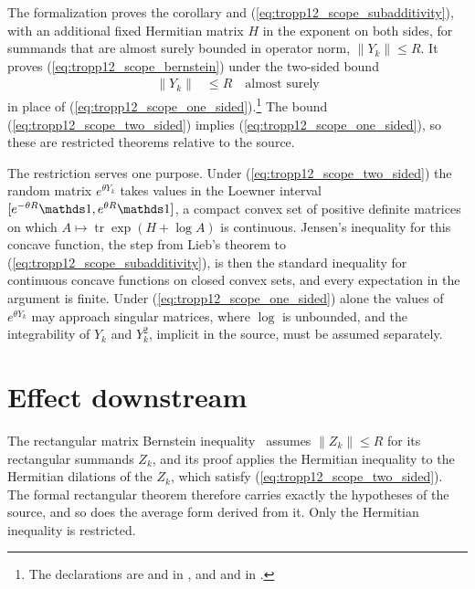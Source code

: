 \documentclass{article}
\begin{document}
The formalization proves the corollary and (\ref{eq:tropp12_scope_subadditivity}), with an
additional fixed Hermitian matrix $H$ in the exponent on both sides, for
summands that are almost surely bounded in operator norm, $\|Y_k\|\le R$. It
proves (\ref{eq:tropp12_scope_bernstein}) under the two-sided bound
\begin{align}
    \|Y_k\| & \le R\quad\text{almost surely}
    \label{eq:tropp12_scope_two_sided}
\end{align}
in place of (\ref{eq:tropp12_scope_one_sided}).\footnote{The declarations are
     and
     in
    , and
     and
     in
    .} The bound
(\ref{eq:tropp12_scope_two_sided}) implies
(\ref{eq:tropp12_scope_one_sided}), so these are restricted theorems relative
to the source.

The restriction serves one purpose. Under (\ref{eq:tropp12_scope_two_sided})
the random matrix $e^{\theta Y_k}$ takes values in the Loewner interval
$[e^{-\theta R}\Id,e^{\theta R}\Id]$, a compact convex set of positive definite
matrices on which $A\mapsto\operatorname{tr}\exp(H+\log A)$ is continuous.
Jensen's inequality for this concave function, the step from Lieb's theorem to
(\ref{eq:tropp12_scope_subadditivity}), is then the standard inequality for
continuous concave functions on closed convex sets, and every expectation in the
argument is finite. Under (\ref{eq:tropp12_scope_one_sided}) alone the values of
$e^{\theta Y_k}$ may approach singular matrices, where $\log$ is unbounded, and
the integrability of $Y_k$ and $Y_k^2$, implicit in the source, must be assumed
separately.

\section{Effect downstream}

The rectangular matrix Bernstein inequality~\cite[Theorem~1.6]{Tropp2012User}
assumes $\|Z_k\|\le R$ for its rectangular summands $Z_k$, and its proof applies
the Hermitian inequality to the Hermitian dilations of the $Z_k$, which satisfy
(\ref{eq:tropp12_scope_two_sided}). The formal rectangular theorem therefore
carries exactly the hypotheses of the source, and so does the average form
derived from it. Only the Hermitian inequality is restricted.
\end{document}
